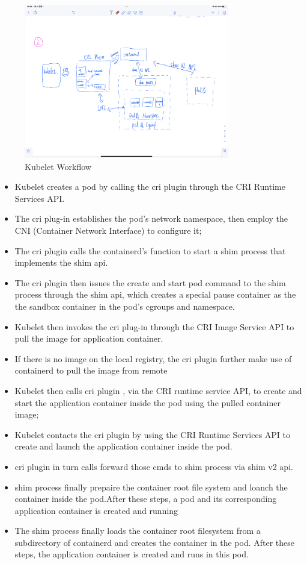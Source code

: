     \begin{figure}[H]
        \centering
        \includegraphics[width=0.8\textwidth]{images/IMG_4417.PNG}
        \caption[Kubelet Workflow]{Kubelet Workflow}
        \label{fig:Kubelet}
    \end{figure}


    \begin{itemize}
        \item Kubelet creates a pod by calling the cri plugin through the CRI Runtime Services API.
        \item The cri plug-in establishes the pod's network namespace, then employ the CNI (Container Network Interface) to configure it;
        \item The cri plugin calls the containerd's function to start a shim process that implements the shim api.
        \item The cri plugin then issues the create and start pod command to the shim process through the shim api, which creates a special pause container as the the sandbox container in the pod's cgroups and namespace.
        \item Kubelet then invokes the cri plug-in through the CRI Image Service API to pull the image for application container.
        \item If there is no image on the local registry, the cri plugin further make use of containerd to pull the image from remote
        \item Kubelet then calls cri plugin , via the CRI runtime service API, to create and start the application container inside the pod using the pulled container image;
        \item Kubelet contacts the cri plugin by using the CRI Runtime Services API to create and launch the application container inside the pod.
        \item cri plugin in turn calls forward those cmds to shim process via shim v2 api.
        \item shim process finally prepaire the container root file system  and loanch the container inside the pod.After these steps, a pod and its corresponding application container is created and running
        \item The shim process finally loads the container root filesystem from a subdirectory of containerd and creates the container in the pod. After these steps, the application container is created and runs in this pod.
    \end{itemize}


